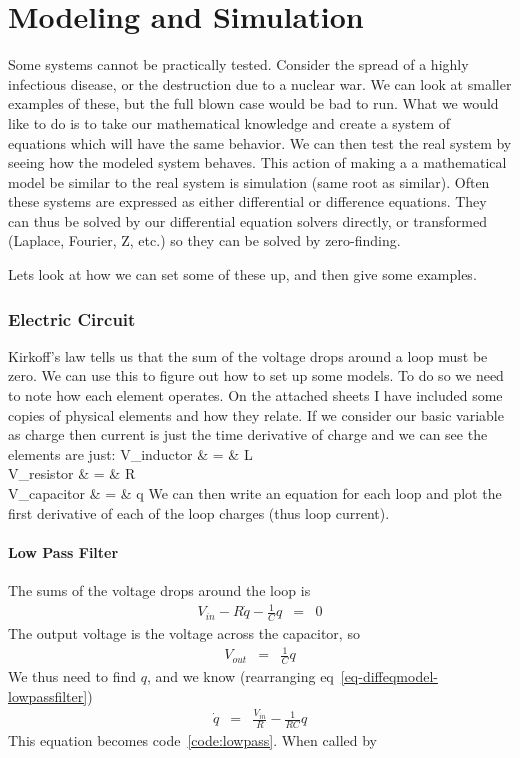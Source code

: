 \chapter{Modeling and Simulation}\label{c-ModSim}

Some systems cannot be practically tested.  Consider the spread of a highly infectious disease, or the destruction due to a nuclear war.  We can look at smaller examples of these, but the full blown case would be bad to run.  What we would like to do is to take our mathematical knowledge and create a system of equations which will have the same behavior.  We can then test the real system by seeing how the modeled system behaves.  This action of making a a mathematical model be similar to the real system is simulation (same root as similar).  Often these systems are expressed as either differential or difference equations.  They can thus be solved by our differential equation solvers directly, or transformed (Laplace, Fourier, Z, etc.) so they can be solved by zero-finding.

Lets look at how we can set some of these up, and then give some examples.

\subsection{Electric Circuit}
Kirkoff's law tells us that the sum of the voltage drops around a loop must be zero.  We can use this to figure out how to set up some models.  To do so we need to note how each element operates.  On the attached sheets I have included some copies of physical elements and how they relate.  If we consider our basic variable as charge then current is just the time derivative of charge and we can see the elements are just:
\beqn
V_{inductor} & = & L \\
V_{resistor} & = & R \\
V_{capacitor} & = & q
\eeqn
We can then write an equation for each loop and plot the first derivative of each of the loop charges (thus loop current).

\subsubsection{Low Pass Filter}

The sums of the voltage drops around the loop is
\begin{eqnarray}
V_{in} - R\dot q -\frac{1}{C}q &=& 0\label{eq-diffeqmodel-lowpassfilter}
\end{eqnarray}
The output voltage is the voltage across the capacitor, so
\begin{eqnarray}
V_{out} &=&\frac{1}{C}q
\end{eqnarray}
We thus need to find $q$, and we know (rearranging eq~\ref{eq-diffeqmodel-lowpassfilter})
\begin{eqnarray}
\dot q &=& \frac{V_{in}}{R} -\frac{1}{RC}q
\end{eqnarray}
This equation becomes code~\ref{code:lowpass}.
When called by

